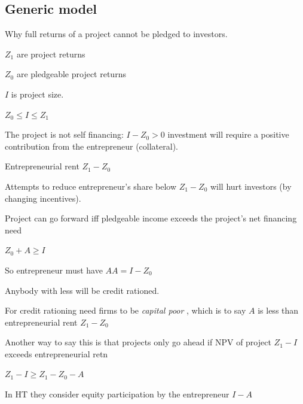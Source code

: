 \documentclass{article}
\begin{document}
\subsection{Generic model}

Why full returns of a project cannot be pledged to investors.

$Z_{1}$ are project returns

$Z_{0}$ are pledgeable project returns

$I$ is project size.

$Z_{0}\leq I\leq Z_{1}$

The project is not self financing: $I-Z_{0}>0$ investment will require a
positive contribution from the entrepreneur (collateral).

Entrepreneurial rent $Z_{1}-Z_{0}$

Attempts to reduce entrepreneur's share below $Z_{1}-Z_{0}$ will hurt
investors (by changing incentives).

\bigskip 

Project can go forward iff pledgeable income exceeds the project's net
financing need

$Z_{0}+A\geq I$

So entrepreneur must have $A$\TEXTsymbol{>}\underline{$A$}$=I-Z_{0}$

Anybody with less will be credit rationed. \ 

For credit rationing need firms to be \emph{capital poor }, which is to say $%
A$ is less than entrepreneurial rent $Z_{1}-Z_{0}$

\bigskip Another way to say this is that projects only go ahead if NPV of
project $Z_{1}-I$ exceeds entrepreneurial retn

\bigskip $Z_{1}-I\geq Z_{1}-Z_{0}-A$

In HT they consider equity participation by the entrepreneur $I-A$
\end{document}
